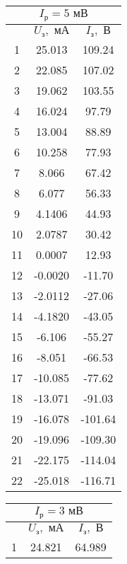 \documentclass[a4paper,12pt]{article} %
\begin{document}
\begin{enumerate}
    \begin{table}[h]
	\centering
	\begin{tabular}{|c|c|c|}
            \hline
            \multicolumn{3}{|c|}{$I_\text{р} = 5 \text{ мВ}$} \\ \hline
		\hline
		& $ U_{\text{з}}, \text{ мА}$ & $ I_{\text{з}}, \text{ В}$ \\ \hline
		1 & 25.013 & 109.24 \\ \hline
            2 & 22.085 & 107.02 \\ \hline
            3 & 19.062 & 103.55 \\ \hline
            4 & 16.024 & 97.79 \\ \hline
            5 & 13.004 & 88.89 \\ \hline
            6 & 10.258 & 77.93 \\ \hline
            7 & 8.066 & 67.42 \\ \hline
            8 & 6.077 & 56.33 \\ \hline
            9 & 4.1406 & 44.93 \\ \hline
            10 & 2.0787 & 30.42 \\ \hline
            11 & 0.0007 & 12.93 \\ \hline
            12 & -0.0020 & -11.70 \\ \hline
            13 & -2.0112 & -27.06 \\ \hline
            14 & -4.1820 & -43.05 \\ \hline
            15 & -6.106 & -55.27 \\ \hline
            16 & -8.051 & -66.53 \\ \hline
            17 & -10.085 & -77.62 \\ \hline
            18 & -13.071 & -91.03 \\ \hline
            19 & -16.078 & -101.64 \\ \hline
            20 & -19.096 & -109.30 \\ \hline
            21 & -22.175 & -114.04 \\ \hline
            22 & -25.018 & -116.71 \\ \hline
	\end{tabular}
        \begin{tabular}{|c|c|c|}
            \hline
            \multicolumn{3}{|c|}{$I_\text{р} = 3 \text{ мВ}$} \\ \hline
		\hline
		& $ U_{\text{з}}, \text{ мА}$ & $ I_{\text{з}}, \text{ В}$ \\ \hline
		1 & 24.821 & 64.989 \\ \hline

\end{tabular}
\end{table}
\end{enumerate}
\end{document}
